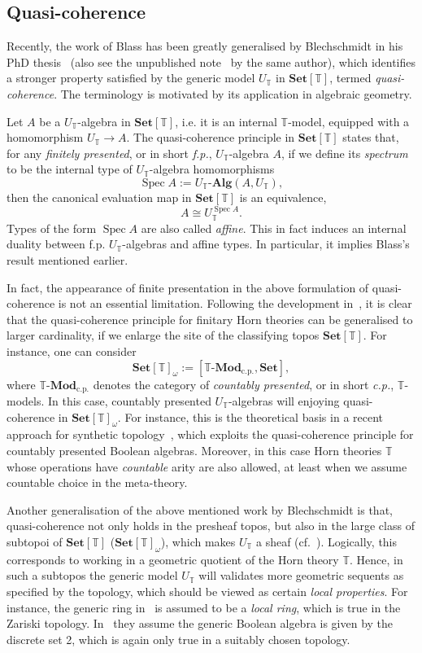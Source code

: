 \documentclass[12pt]{amsart}
\theoremstyle{definition}
\newcommand{\mb}[1]{\mathbf{#1}}
\newcommand{\mbb}[1]{\mathbb{#1}}
\newcommand{\T}{\mbb T}
\newcommand{\mr}[1]{\mathrm{#1}}
\newcommand{\Set}{\mb{Set}}
\newcommand{\alg}{\text{-}\mb{Alg}}
\newcommand{\cp}{_{\mr{c.p.}}}
\newcommand{\mmod}[1]{#1\text{-}\mathbf{Mod}}
\newcommand{\spec}{\operatorname{Spec}}
\begin{document}
\subsection{Quasi-coherence}\label{subsec:qc}

Recently, the work of Blass has been greatly generalised by Blechschmidt in his PhD thesis~\cite{blechschmidt2021using} (also see the unpublished note~\cite{blechschmidt2020general} by the same author), which identifies a stronger property satisfied by the generic model $U_\T$ in $\Set[\T]$, termed \emph{quasi-coherence}. The terminology is motivated by its application in algebraic geometry.

Let $A$ be a $U_\T$-algebra in $\Set[\T]$, i.e. it is an internal $\T$-model, equipped with a homomorphism $U_\T \to A$. The quasi-coherence principle in $\Set[\T]$ states that, for any \emph{finitely presented}, or in short \emph{f.p.}, $U_\T$-algebra $A$, if we define its \emph{spectrum} to be the internal type of $U_\T$-algebra homomorphisms
\[ \spec A := U_\T\alg(A,U_\T), \]
then the canonical evaluation map in $\Set[\T]$ is an equivalence,
\[ A \cong U_\T^{\spec A}. \]
Types of the form $\spec A$ are also called \emph{affine}. This in fact induces an internal duality between f.p. $U_\T$-algebras and affine types. In particular, it implies Blass's result mentioned earlier. 

In fact, the appearance of finite presentation in the above formulation of quasi-coherence is not an essential limitation. Following the development in~\cite{blechschmidt2021using,blechschmidt2020general}, it is clear that the quasi-coherence principle for finitary Horn theories can be generalised to larger cardinality, if we enlarge the site of the classifying topos $\Set[\T]$. For instance, one can consider
\[ \Set[\T]_\omega := [\mmod\T\cp,\Set], \]
where $\mmod\T\cp$ denotes the category of \emph{countably presented}, or in short \emph{c.p.}, $\T$-models. In this case, countably presented $U_\T$-algebras will enjoying quasi-coherence in $\Set[\T]_\omega$. For instance, this is the theoretical basis in a recent approach for synthetic topology~\cite{cherubini2024foundation}, which exploits the quasi-coherence principle for countably presented Boolean algebras. Moreover, in this case Horn theories $\T$ whose operations have \emph{countable} arity are also allowed, at least when we assume countable choice in the meta-theory.

Another generalisation of the above mentioned work by Blechschmidt is that, quasi-coherence not only holds in the presheaf topos, but also in the large class of subtopoi of $\Set[\T]$ ($\Set[\T]_\omega$), which makes $U_\T$ a sheaf (cf.~\cite[Cor. 7.7]{blechschmidt2020general}). Logically, this corresponds to working in a geometric quotient of the Horn theory $\T$. Hence, in such a subtopos the generic model $U_\T$ will validates more geometric sequents as specified by the topology, which should be viewed as certain \emph{local properties}. For instance, the generic ring in~\cite{Cherubini_Coquand_Hutzler_2024} is assumed to be a \emph{local ring}, which is true in the Zariski topology. In~\cite{cherubini2024foundation} they assume the generic Boolean algebra is given by the discrete set 2, which is again only true in a suitably chosen topology.
\end{document}
